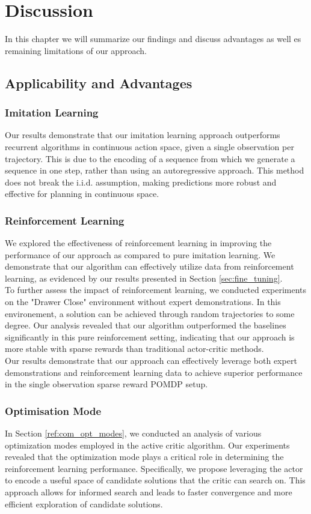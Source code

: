 
\chapter{Discussion}
\label{chapter:Discussion}
In this chapter we will summarize our findings and discuss advantages as well es remaining limitations of our approach.
\section{Applicability and Advantages}
\subsection{Imitation Learning}
Our results demonstrate that our imitation learning approach outperforms recurrent algorithms in continuous action space, 
given a single observation per trajectory. This is due to the encoding of a sequence from which we generate a sequence in one step, 
rather than using an autoregressive approach. This method does not break the i.i.d. assumption, making predictions more robust and effective 
for planning in continuous space. \\
\subsection{Reinforcement Learning}
We explored the effectiveness of reinforcement learning in improving the performance of our approach as compared to pure imitation learning. 
We demonstrate that our algorithm can effectively utilize data from reinforcement learning, as evidenced by our results presented in 
Section \ref{sec:fine_tuning}.\\
To further assess the impact of reinforcement learning, we conducted experiments on the "Drawer Close" environment without expert demonstrations. 
In this environement, a solution can be achieved through random trajectories to some degree. 
Our analysis revealed that our algorithm outperformed the baselines significantly in this pure reinforcement setting, 
indicating that our approach is more stable with sparse rewards than traditional actor-critic methods.\\
Our results demonstrate that our approach can effectively leverage both expert demonstrations and reinforcement learning data to achieve 
superior performance in the single observation sparse reward POMDP setup.

\subsection{Optimisation Mode}
In Section \ref{ref:com_opt_modes}, we conducted an analysis of various optimization modes employed in the active critic algorithm. 
Our experiments revealed that the optimization mode plays a critical role in determining the reinforcement learning performance. 
Specifically, we propose leveraging the actor to encode a useful space of candidate solutions that the critic can search on. 
This approach allows for informed search and leads to faster convergence and more efficient exploration of candidate solutions.

